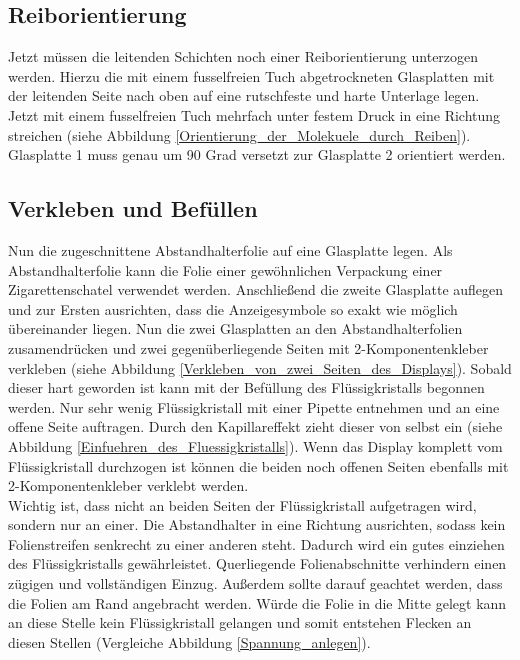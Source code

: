 \subsection{Reiborientierung}

Jetzt müssen die leitenden Schichten noch einer Reiborientierung unterzogen werden. Hierzu die mit einem fusselfreien Tuch abgetrockneten Glasplatten mit der leitenden Seite nach oben auf eine rutschfeste und harte Unterlage legen. Jetzt mit einem fusselfreien Tuch mehrfach unter festem Druck in eine Richtung streichen (siehe Abbildung \ref{Orientierung_der_Molekuele_durch_Reiben}). Glasplatte 1 muss genau um 90 Grad versetzt zur Glasplatte 2 orientiert werden.

\subsection{Verkleben und Befüllen}

Nun die zugeschnittene Abstandhalterfolie auf eine Glasplatte legen. Als Abstandhalterfolie kann die Folie einer gewöhnlichen Verpackung einer Zigarettenschatel verwendet werden. 
Anschließend die zweite Glasplatte auflegen und zur Ersten ausrichten, dass die Anzeigesymbole so exakt wie möglich übereinander liegen. Nun die zwei Glasplatten an den Abstandhalterfolien zusamendrücken und zwei gegenüberliegende Seiten mit 2-Komponentenkleber verkleben (siehe Abbildung \ref{Verkleben_von_zwei_Seiten_des_Displays}). Sobald dieser hart geworden ist kann mit der Befüllung des Flüssigkristalls begonnen werden.
Nur sehr wenig Flüssigkristall mit einer Pipette entnehmen und an eine offene Seite auftragen. Durch den Kapillareffekt zieht dieser von selbst ein (siehe Abbildung \ref{Einfuehren_des_Fluessigkristalls}). Wenn das Display komplett vom Flüssigkristall durchzogen ist können die beiden noch offenen Seiten ebenfalls mit 2-Komponentenkleber verklebt werden.\\

Wichtig ist, dass nicht an beiden Seiten der Flüssigkristall aufgetragen wird, sondern nur an einer.
Die Abstandhalter in eine Richtung ausrichten, sodass kein Folienstreifen senkrecht zu einer anderen steht. Dadurch wird ein gutes einziehen des Flüssigkristalls gewährleistet. Querliegende Folienabschnitte verhindern einen zügigen und vollständigen Einzug.
Außerdem sollte darauf geachtet werden, dass die Folien am Rand angebracht werden. Würde die Folie in die Mitte gelegt kann an diese Stelle kein Flüssigkristall gelangen und somit entstehen Flecken an diesen Stellen (Vergleiche Abbildung \ref{Spannung_anlegen}).

